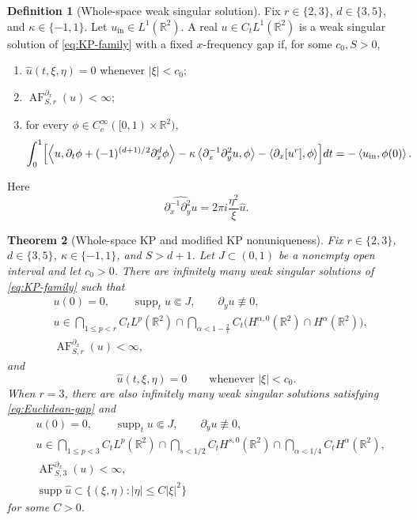\documentclass[12pt,reqno,letterpaper]{amsart}
\numberwithin{equation}{section}
\newtheorem{theorem}{Theorem}[section]
\theoremstyle{definition}
\newtheorem{definition}[theorem]{Definition}
\newcommand{\R}{\mathbb R}
\newcommand{\supp}{\operatorname{supp}}
\newcommand{\ip}[2]{\left\langle #1,#2\right\rangle}
\newcommand{\abs}[1]{\left\lvert #1\right\rvert}
\begin{document}
\begin{definition}[Whole-space weak singular solution]
\label{def:Euclidean-solution}
Fix $r\in\{2,3\}$, $d\in\{3,5\}$, and $\kappa\in\{-1,1\}$.  Let
$u_{\mathrm{in}}\in L^1(\R^2)$.  A real $u\in C_tL^1(\R^2)$ is a weak singular solution of
\eqref{eq:KP-family} with a fixed $x$-frequency gap if, for some
$c_0,S>0$,
\begin{enumerate}[label=\textup{(\roman*)}]
 \item $\widehat u(t,\xi,\eta)=0$ whenever $\abs\xi<c_0$;
 \item $\operatorname{AF}^{\partial_x}_{S,r}(u)<\infty$;
 \item for every $\phi\in C_c^\infty([0,1)\times\R^2)$,
 \begin{equation}\label{eq:Euclidean-weak-form}
  \int_0^1\Bigl[
   \ip{u}{\partial_t\phi+(-1)^{(d+1)/2}\partial_x^d\phi}
   -\kappa\ip{\partial_x^{-1}\partial_y^2u}{\phi}
   -\ip{\partial_x[u^r]}{\phi}
  \Bigr]dt
  =-\ip{u_{\mathrm{in}}}{\phi(0)}.
 \end{equation}
\end{enumerate}
Here
\[
 \widehat{\partial_x^{-1}\partial_y^2u}
 =2\pi i\frac{\eta^2}{\xi}\widehat u.
\]
\end{definition}

\begin{theorem}[Whole-space KP and modified KP nonuniqueness]
\label{thm:Euclidean}
Fix $r\in\{2,3\}$, $d\in\{3,5\}$, $\kappa\in\{-1,1\}$, and
$S>d+1$.  Let $J\subset(0,1)$ be a nonempty open interval and let
$c_0>0$.  There are infinitely many weak singular solutions of
\eqref{eq:KP-family} such that
\begin{equation}\label{eq:Euclidean-regularity}
 \begin{aligned}
 &u(0)=0,\qquad \supp_tu\Subset J,\qquad \partial_yu\not\equiv0,\\
 &u\in\bigcap_{1\leq p<r}C_tL^p(\R^2)
 \cap\bigcap_{\alpha<1-\frac2r}
 C_t\bigl(H^{\alpha,0}(\R^2)\cap H^\alpha(\R^2)\bigr),\\
 &\operatorname{AF}^{\partial_x}_{S,r}(u)<\infty,
 \end{aligned}
\end{equation}
and
\begin{equation}\label{eq:Euclidean-gap}
 \widehat u(t,\xi,\eta)=0\qquad\text{whenever }\abs\xi<c_0.
\end{equation}
When $r=3$, there are also infinitely many weak singular
solutions satisfying \eqref{eq:Euclidean-gap} and
\begin{equation}\label{eq:Euclidean-parabolic-regularity}
 \begin{aligned}
 &u(0)=0,\qquad \supp_tu\Subset J,\qquad \partial_yu\not\equiv0,\\
 &u\in\bigcap_{1\leq p<3}C_tL^p(\R^2)
 \cap\bigcap_{s<1/2}C_tH^{s,0}(\R^2)
 \cap\bigcap_{\alpha<1/4}C_tH^\alpha(\R^2),\\
 &\operatorname{AF}^{\partial_x}_{S,3}(u)<\infty,\\
 &\supp\widehat u\subset
 \{(\xi,\eta):\abs\eta\leq C\abs\xi^2\}
 \end{aligned}
\end{equation}
for some $C>0$.
\end{theorem}
\end{document}

